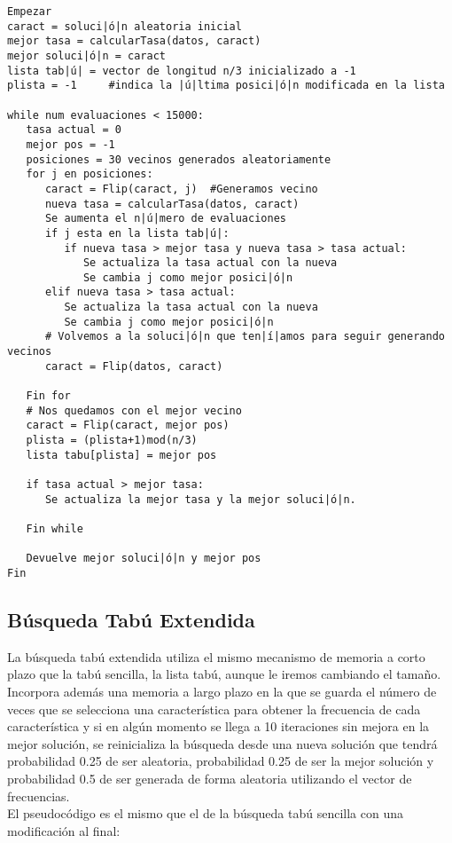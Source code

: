 \documentclass[12pt]{article}
\begin{document}
\begin{lstlisting}
Empezar
caract = soluci|ó|n aleatoria inicial
mejor tasa = calcularTasa(datos, caract)
mejor soluci|ó|n = caract
lista tab|ú| = vector de longitud n/3 inicializado a -1
plista = -1		#indica la |ú|ltima posici|ó|n modificada en la lista

while num evaluaciones < 15000:
   tasa actual = 0
   mejor pos = -1
   posiciones = 30 vecinos generados aleatoriamente
   for j en posiciones:
      caract = Flip(caract, j) 	#Generamos vecino
      nueva tasa = calcularTasa(datos, caract)
      Se aumenta el n|ú|mero de evaluaciones
      if j esta en la lista tab|ú|:
         if nueva tasa > mejor tasa y nueva tasa > tasa actual:
            Se actualiza la tasa actual con la nueva
            Se cambia j como mejor posici|ó|n
      elif nueva tasa > tasa actual:
         Se actualiza la tasa actual con la nueva
         Se cambia j como mejor posici|ó|n
      # Volvemos a la soluci|ó|n que ten|í|amos para seguir generando vecinos
      caract = Flip(datos, caract)
   
   Fin for
   # Nos quedamos con el mejor vecino
   caract = Flip(caract, mejor pos)
   plista = (plista+1)mod(n/3)
   lista tabu[plista] = mejor pos
   
   if tasa actual > mejor tasa:
      Se actualiza la mejor tasa y la mejor soluci|ó|n.

   Fin while
   
   Devuelve mejor soluci|ó|n y mejor pos
Fin

\end{lstlisting}

\subsection{Búsqueda Tabú Extendida}
La búsqueda tabú extendida utiliza el mismo mecanismo de memoria a corto plazo que la tabú sencilla, la lista tabú, aunque le iremos cambiando el tamaño. Incorpora además una memoria a largo plazo en la que se guarda el número de veces que se selecciona una característica para obtener la frecuencia de cada característica y si en algún momento se llega a 10 iteraciones sin mejora en la mejor solución, se reinicializa la búsqueda desde una nueva solución que tendrá probabilidad 0.25 de ser aleatoria, probabilidad 0.25 de ser la mejor solución y probabilidad 0.5 de ser generada de forma aleatoria utilizando el vector de frecuencias.\\

El pseudocódigo es el mismo que el de la búsqueda tabú sencilla con una modificación al final:
\end{document}
